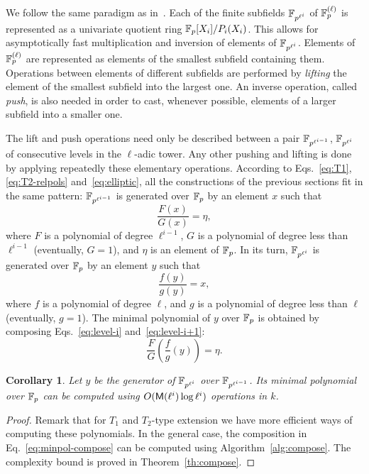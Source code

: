 \documentclass{sig-alternate}
\newtheorem{corollary}[definition]{Corollary}
\begin{document}
We follow the same paradigm as in~\cite{df+schost12}. Each of the
finite subfields $\mathbb{F}_{p^{\ell^i}}$ of $\mathbb{F}_p^{(\ell)}$ is represented
as a univariate quotient ring $\mathbb{F}_p[X_i]/P_i(X_i)$. This allows for
asymptotically fast multiplication and inversion of elements of
$\mathbb{F}_{p^{\ell^i}}$. Elements of $\mathbb{F}_p^{(\ell)}$ are represented as
elements of the smallest subfield containing them. Operations between
elements of different subfields are performed by \emph{lifting} the
element of the smallest subfield into the largest one. An inverse
operation, called \emph{push}, is also needed in order to cast,
whenever possible, elements of a larger subfield into a smaller one.

The lift and push operations need only be described between a pair
$\mathbb{F}_{p^{\ell^{i-1}}}$, $\mathbb{F}_{p^{\ell^i}}$ of consecutive levels in the
$\ell$-adic tower. Any other pushing and lifting is done by applying
repeatedly these elementary operations. According to
Eqs.~\eqref{eq:T1}, \eqref{eq:T2-relpols} and~\eqref{eq:elliptic}, all
the constructions of the previous sections fit in the same pattern:
$\mathbb{F}_{p^{\ell^{i-1}}}$ is generated over $\mathbb{F}_p$ by an element $x$ such
that
\begin{equation}
  \label{eq:level-i}
  \frac{F(x)}{G(x)} = \eta,
\end{equation}
where $F$ is a polynomial of degree $\ell^{i-1}$, $G$ is a polynomial
of degree less than $\ell^{i-1}$ (eventually, $G=1$), and $\eta$ is an
element of $\mathbb{F}_p$. In its turn, $\mathbb{F}_{p^{\ell^i}}$ is generated over
$\mathbb{F}_p$ by an element $y$ such that
\begin{equation}
  \label{eq:level-i+1}
  \frac{f(y)}{g(y)} = x,
\end{equation}
where $f$ is a polynomial of degree $\ell$, and $g$ is a
polynomial of degree less than $\ell$ (eventually, $g=1$). The
minimal polynomial of $y$ over $\mathbb{F}_p$ is obtained by composing
Eqs.~\eqref{eq:level-i} and~\eqref{eq:level-i+1}:
\begin{equation}
  \label{eq:minpol-compose}
  \frac{F}{G}\left(\frac{f}{g}(y)\right) = \eta.
\end{equation}

\begin{corollary}
  \sloppy
  Let $y$ be the generator of $\mathbb{F}_{p^{\ell^i}}$ over
  $\mathbb{F}_{p^{\ell^{i-1}}}$. Its minimal polynomial over $\mathbb{F}_p$ can be
  computed using $O(\mathsf{M}(\ell^i)\log\ell^i)$ operations in $k$.
\end{corollary}
\begin{proof}
  Remark that for $T_1$ and $T_2$-type extension we have more
  efficient ways of computing these polynomials. In the general case,
  the composition in Eq.~\eqref{eq:minpol-compose} can be computed
  using Algorithm~\ref{alg:compose}. The complexity bound is proved in
  Theorem~\ref{th:compose}.
\end{proof}
\end{document}
